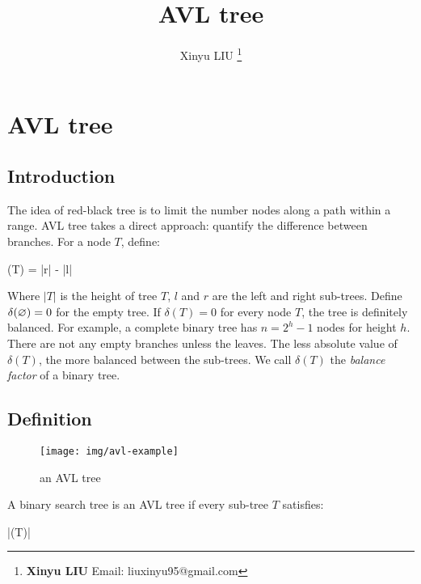 \documentclass[b5paper]{article}
\begin{document}
\title{AVL tree}

\author{Xinyu LIU
\thanks{{\bfseries Xinyu LIU} \newline
  Email: liuxinyu95@gmail.com \newline}
  }

\maketitle
\fi


\ifx\wholebook\relax
\chapter{AVL tree}
\fi

\section{Introduction}
\label{introduction} 

The idea of red-black tree is to limit the number nodes along a path within a range. AVL tree takes a direct approach: quantify the difference between branches. For a node $T$, define:

\be
  \delta(T) = |r| - |l|
\ee

Where $|T|$ is the height of tree $T$, $l$ and $r$ are the left and right sub-trees. Define $\delta(\varnothing) = 0$ for the empty tree. If $\delta(T) = 0$ for every node $T$, the tree is definitely balanced. For example, a complete binary tree has $n=2^h - 1$ nodes for height $h$. There are not any empty branches unless the leaves. The less absolute value of $\delta(T)$, the more balanced between the sub-trees. We call $\delta(T)$ the {\em balance factor} of a binary tree.

\section{Definition}

\begin{figure}[htbp]
   \centering
   \texttt{[image: img/avl-example]}
   \caption{an AVL tree}
   \label{fig:avl-example}
\end{figure}

A binary search tree is an AVL tree if every sub-tree $T$ satisfies:

\be
  |\delta(T)| 
  \label{eq:avl-rule}
\ee
\end{document}
